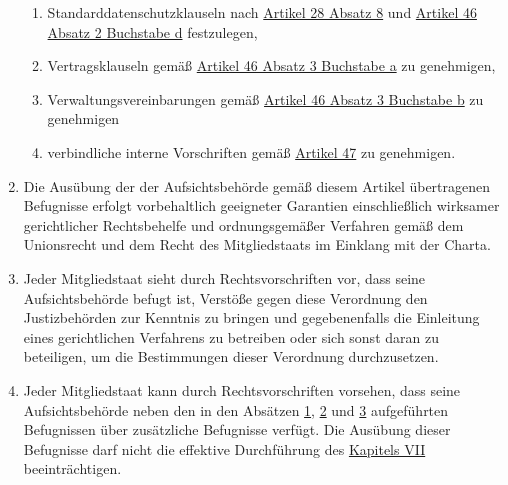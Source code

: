 \begin{enumerate}
\begin{enumerate}
    \item Standarddatenschutzklauseln nach \hyperref[itm:28-8]{Artikel 28 Absatz 8} und \hyperref[itm:46-2d]{Artikel 46
     Absatz 2 Buchstabe d} festzulegen,
    \label{itm:58-3g}

    \item Vertragsklauseln gemäß \hyperref[itm:46-3a]{Artikel 46 Absatz 3 Buchstabe a} zu genehmigen,
    \label{itm:58-3h}

    \item Verwaltungsvereinbarungen gemäß \hyperref[itm:46-3b]{Artikel 46 Absatz 3 Buchstabe b} zu genehmigen
    \label{itm:58-3i}

    \item verbindliche interne Vorschriften gemäß \hyperref[ch:47]{Artikel 47} zu genehmigen.
    \label{itm:58-3j}

  \end{enumerate}

  \item Die Ausübung der der Aufsichtsbehörde gemäß diesem Artikel übertragenen Befugnisse erfolgt vorbehaltlich
   geeigneter Garantien einschließlich wirksamer gerichtlicher Rechtsbehelfe und ordnungsgemäßer Verfahren gemäß dem
   Unionsrecht und dem Recht des Mitgliedstaats im Einklang mit der Charta.
  \label{itm:58-4}

  \item Jeder Mitgliedstaat sieht durch Rechtsvorschriften vor, dass seine Aufsichtsbehörde befugt ist, Verstöße gegen
   diese Verordnung den Justizbehörden zur Kenntnis zu bringen und gegebenenfalls die Einleitung eines gerichtlichen
   Verfahrens zu betreiben oder sich sonst daran zu beteiligen, um die Bestimmungen dieser Verordnung durchzusetzen.
  \label{itm:58-5}

  \item Jeder Mitgliedstaat kann durch Rechtsvorschriften vorsehen, dass seine Aufsichtsbehörde neben den in den
   Absätzen \hyperref[itm:58-1]{1}, \hyperref[itm:58-2]{2} und \hyperref[itm:58-3]{3} aufgeführten Befugnissen über
   zusätzliche Befugnisse verfügt. Die Ausübung dieser Befugnisse darf nicht die effektive Durchführung des \hyperref
   [part:7]{Kapitels VII} beeinträchtigen.
  \label{itm:58-6}

\end{enumerate}


